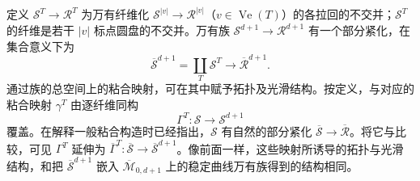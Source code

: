 定义 $\mathcal S^T\to\mathcal R^T$ 为万有纤维化 $\mathcal S^{|v|}\to\mathcal R^{|v|}$（$v\in\operatorname{Ve}(T)$）的各拉回的不交并；$\mathcal S^T$ 的纤维是若干 $|v|$ 标点圆盘的不交并。万有族 $\mathcal S^{d+1}\to\mathcal R^{d+1}$ 有一个部分紧化，在集合意义下为
\begin{equation}\label{eq:9.16}
\overline{\mathcal S}^{d+1}=\coprod_T\mathcal S^T\longrightarrow\overline{\mathcal R}^{d+1}.
\end{equation}
通过族的总空间上的粘合映射，可在其中赋予拓扑及光滑结构。按定义，与对应的粘合映射 $\gamma^T$ 由逐纤维同构
\[
\Gamma^T:\mathcal S\longrightarrow\mathcal S^{d+1}
\]
覆盖。在解释一般粘合构造时已经指出，$\mathcal S$ 有自然的部分紧化 $\overline{\mathcal S}\to\overline{\mathcal R}$。将它与比较，可见 $\Gamma^T$ 延伸为 $\overline\Gamma^T:\overline{\mathcal S}\to\overline{\mathcal S}^{d+1}$。像前面一样，这些映射所诱导的拓扑与光滑结构，和把 $\overline{\mathcal S}^{d+1}$ 嵌入 $\overline{\mathcal M}_{0,d+1}$ 上的稳定曲线万有族得到的结构相同。

